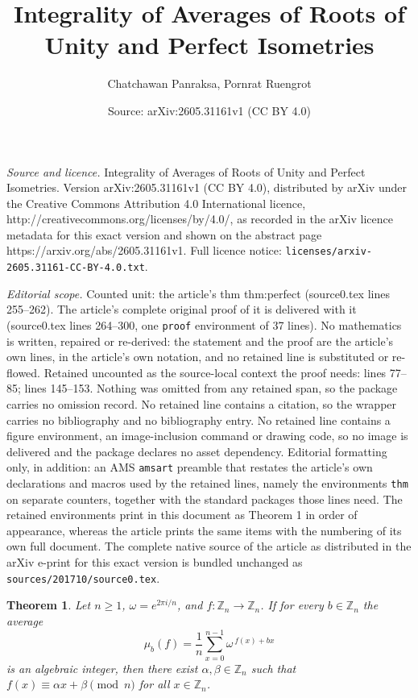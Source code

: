 \documentclass[10pt,a4paper]{amsart}
\title{Integrality of Averages of Roots of Unity and Perfect Isometries}
\author{Chatchawan Panraksa, Pornrat Ruengrot}
\date{Source: arXiv:2605.31161v1 (CC BY 4.0)}
\newtheorem{thm}{Theorem}
\begin{document}
\maketitle

\noindent\emph{Source and licence.} Integrality of Averages of Roots of Unity and Perfect Isometries. Version arXiv:2605.31161v1 (CC BY 4.0), distributed by arXiv under the Creative Commons Attribution 4.0 International licence, http://creativecommons.org/licenses/by/4.0/, as recorded in the arXiv licence metadata for this exact version and shown on the abstract page https://arxiv.org/abs/2605.31161v1. Full licence notice: \texttt{licenses/arxiv-2605.31161-CC-BY-4.0.txt}.\par\smallskip

\noindent\textit{Editorial scope.} Counted unit: the article's thm thm:perfect (source0.tex lines 255--262). The article's complete original proof of it is delivered with it (source0.tex lines 264--300, one \texttt{proof} environment of 37 lines). No mathematics is written, repaired or re-derived: the statement and the proof are the article's own lines, in the article's own notation, and no retained line is substituted or re-flowed.  Retained uncounted as the source-local context the proof needs: lines 77--85; lines 145--153.  Nothing was omitted from any retained span, so the package carries no omission record.  No retained line contains a citation, so the wrapper carries no bibliography and no bibliography entry.  No retained line contains a figure environment, an image-inclusion command or drawing code, so no image is delivered and the package declares no asset dependency.  Editorial formatting only, in addition: an AMS \texttt{amsart} preamble that restates the article's own declarations and macros used by the retained lines, namely the environments \texttt{thm} on separate counters, together with the standard packages those lines need.  The retained environments print in this document as Theorem 1 in order of appearance, whereas the article prints the same items with the numbering of its own full document.  The complete native source of the article as distributed in the arXiv e-print for this exact version is bundled unchanged as \texttt{sources/201710/source0.tex}.
\begin{thm}\label{thm:alln}
	Let $n\ge 1$, $\omega=e^{2\pi i/n}$, and $f:\mathbb Z_n\to\mathbb Z_n$.
	If for every $b\in\mathbb Z_n$ the average
	\[
		\mu_{b}(f)=\frac1n\sum_{x=0}^{n-1}\omega^{\,f(x)+bx}
	\]
	is an algebraic integer, then there exist $\alpha, \beta \in \mathbb{Z}_n$ such that
	$f(x)\equiv \alpha x+\beta \pmod n$ for all $x\in\mathbb Z_n$.
\end{thm}
\end{document}
